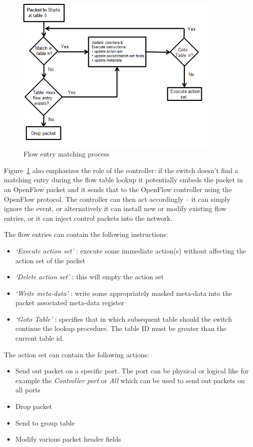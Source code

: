 \documentclass{article}
\begin{document}
\begin{figure}[!htb]
    \centering
    \includegraphics[width=0.9\textwidth]{figures/openflow-processing-flowchart.png}
    \caption{Flow entry matching process}
    \label{fig:OpenFlow-matching-process}
\end{figure}

Figure~\ref{fig:OpenFlow-matching-process} also emphasizes the role of the controller: if the switch doesn't find a matching entry during the flow table lookup it potentially embeds the packet in an OpenFlow packet and it sends that to the OpenFlow controller using the OpenFlow protocol. The controller can then act accordingly -- it can simply ignore the event, or alternatively it can install new  or modify existing flow entries, or it can inject control packets into the network.

The flow entries can contain the following instructions:
\begin{itemize}
\item \emph{`Execute action set'} : execute some immediate action(s) without affecting the action set of the packet
\item \emph{`Delete action set'} : this will empty the action set
\item \emph{`Write meta-data'} : write some appropriately masked meta-data into the packet associated meta-data register
\item \emph{`Goto Table'} : specifies that in which subsequent table should the switch continue the lookup procedure. The table ID must be greater than the current table id.
\end{itemize}

The action set can contain the following actions:
\begin{itemize}
	\item Send out packet on a specific port. The port can be physical or logical like for example the \emph{Controller port} or \emph{All} which can be used to send out packets on all ports
	\item Drop packet
	\item Send to group table
	\item Modify various packet header fields
\end{itemize}
\end{document}
